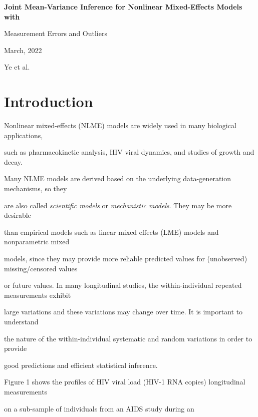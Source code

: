 \documentclass[12pt]{article}
\begin{document}
\begin{center}

 {\Large{\bf Joint Mean-Variance Inference for Nonlinear Mixed-Effects Models with 

   Measurement Errors and Outliers}}



      March, 2022 



      Ye et al. 

\end{center} 

\vspace{1cm}



\section{Introduction}



Nonlinear mixed-effects (NLME) models are widely used in many biological applications, 

such as pharmacokinetic analysis, HIV viral dynamics, and studies of growth and decay. 

Many NLME models are derived based on the underlying data-generation mechanisms, so they 

are also called {\em scientific models} or {\em mechanistic models}. They may be more desirable 

than empirical models such as linear mixed effects (LME) models and nonparametric mixed 

models, since they may provide more reliable predicted values for (unobserved) missing/censored values 

or future values. In many longitudinal studies, the within-individual repeated measurements exhibit 

large variations and these variations may change over time. It is important to understand 

the nature of the within-individual systematic and random variations in order to provide 

good predictions and efficient statistical inference. 





Figure 1 shows the profiles of HIV viral load (HIV-1 RNA copies) longitudinal measurements 

on a sub-sample of individuals from an AIDS study during an 
\end{document}
